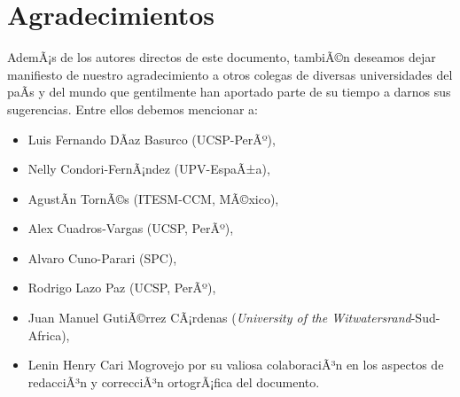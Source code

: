 \chapter*{Agradecimientos}\label{chap:cs-ack}
%

AdemÃ¡s de los autores directos de este documento, tambiÃ©n deseamos dejar manifiesto de nuestro 
agradecimiento a otros colegas de diversas universidades del paÃ­s y del mundo que gentilmente 
han aportado parte de su tiempo a darnos sus sugerencias. Entre ellos debemos mencionar a:

\begin{itemize}
\item Luis Fernando DÃ­az Basurco (UCSP-PerÃº), 
\item Nelly Condori-FernÃ¡ndez (UPV-EspaÃ±a), 
\item AgustÃ­n TornÃ©s (ITESM-CCM, MÃ©xico), 
\item Alex Cuadros-Vargas (UCSP, PerÃº),
\item Alvaro Cuno-Parari (SPC),
\item Rodrigo Lazo Paz (UCSP, PerÃº),
\item Juan Manuel GutiÃ©rrez CÃ¡rdenas (\textit{University of the Witwatersrand}-Sud-Africa),
\item Lenin Henry Cari Mogrovejo por su valiosa colaboraciÃ³n en los aspectos de redacciÃ³n y correcciÃ³n ortogrÃ¡fica del documento.
\end{itemize}

